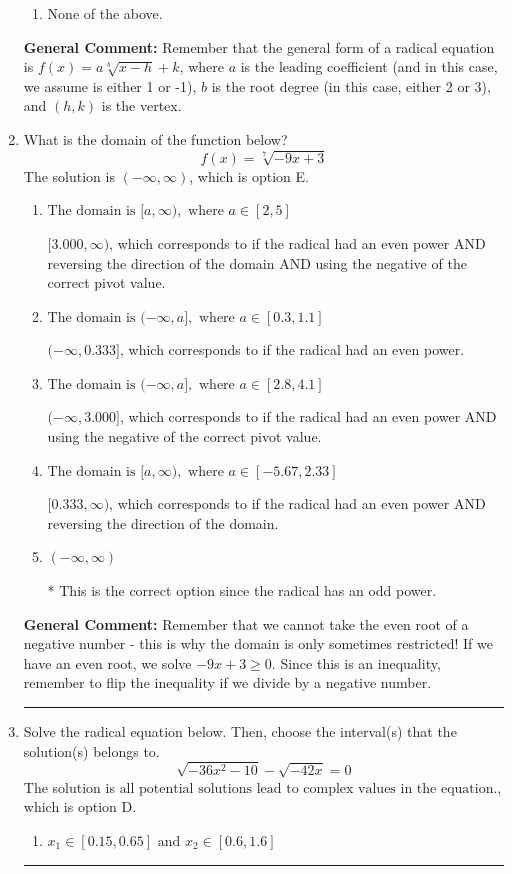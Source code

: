 \documentclass{extbook}[14pt]
\newcommand{\litem}[1]{\item #1

\rule{\textwidth}{0.4pt}}
\begin{document}
\begin{enumerate}
{\begin{enumerate}[label=\Alph*.]
\begin{multicols}{2}
\end{multicols}\item None of the above.\end{enumerate}
\textbf{General Comment:} Remember that the general form of a radical equation is $ f(x) = a \sqrt[b]{x - h} + k $, where $a$ is the leading coefficient (and in this case, we assume is either 1 or -1), $b$ is the root degree (in this case, either 2 or 3), and $(h, k)$ is the vertex.
}
\litem{
What is the domain of the function below?
\[ f(x) = \sqrt[7]{-9 x + 3} \]The solution is \( (-\infty, \infty) \), which is option E.\begin{enumerate}[label=\Alph*.]
\item \( \text{The domain is } [a, \infty), \text{   where } a \in [2, 5] \)

$[3.000, \infty)$, which corresponds to if the radical had an even power AND reversing the direction of the domain AND using the negative of the correct pivot value.
\item \( \text{The domain is } (-\infty, a], \text{   where } a \in [0.3, 1.1] \)

$(-\infty, 0.333]$, which corresponds to if the radical had an even power.
\item \( \text{The domain is } (-\infty, a], \text{   where } a \in [2.8, 4.1] \)

$(-\infty, 3.000]$, which corresponds to if the radical had an even power AND using the negative of the correct pivot value.
\item \( \text{The domain is } [a, \infty), \text{   where } a \in [-5.67, 2.33] \)

$[0.333, \infty)$, which corresponds to if the radical had an even power AND reversing the direction of the domain.
\item \( (-\infty, \infty) \)

* This is the correct option since the radical has an odd power.
\end{enumerate}

\textbf{General Comment:} Remember that we cannot take the even root of a negative number - this is why the domain is only sometimes restricted! If we have an even root, we solve $-9 x + 3 \geq 0$. Since this is an inequality, remember to flip the inequality if we divide by a negative number.
}
\litem{
Solve the radical equation below. Then, choose the interval(s) that the solution(s) belongs to.
\[ \sqrt{-36 x^2 - 10} - \sqrt{-42 x} = 0 \]The solution is \( \text{all potential solutions lead to complex values in the equation.} \), which is option D.\begin{enumerate}[label=\Alph*.]
\item \( x_1 \in [0.15, 0.65] \text{ and } x_2 \in [0.6,1.6] \)


\end{enumerate}}
\end{enumerate}
\end{document}
